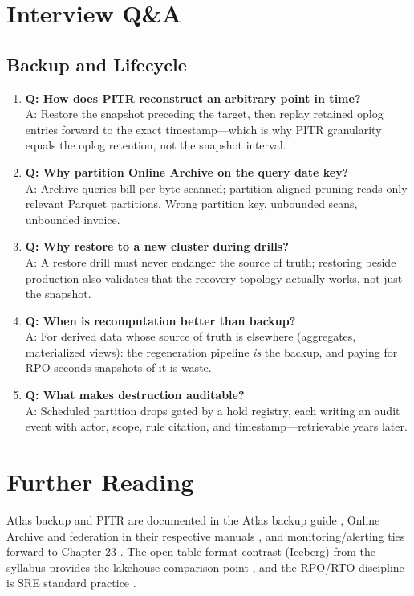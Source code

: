 \section{Interview Q\&A}
\subsection{Backup and Lifecycle}
\begin{enumerate}
    \item \textbf{Q: How does PITR reconstruct an arbitrary point in time?}\\
    A: Restore the snapshot preceding the target, then replay retained oplog entries forward to the exact timestamp---which is why PITR granularity equals the oplog retention, not the snapshot interval.

    \item \textbf{Q: Why partition Online Archive on the query date key?}\\
    A: Archive queries bill per byte scanned; partition-aligned pruning reads only relevant Parquet partitions. Wrong partition key, unbounded scans, unbounded invoice.

    \item \textbf{Q: Why restore to a new cluster during drills?}\\
    A: A restore drill must never endanger the source of truth; restoring beside production also validates that the recovery topology actually works, not just the snapshot.

    \item \textbf{Q: When is recomputation better than backup?}\\
    A: For derived data whose source of truth is elsewhere (aggregates, materialized views): the regeneration pipeline \emph{is} the backup, and paying for RPO-seconds snapshots of it is waste.

    \item \textbf{Q: What makes destruction auditable?}\\
    A: Scheduled partition drops gated by a hold registry, each writing an audit event with actor, scope, rule citation, and timestamp---retrievable years later.
\end{enumerate}

\section{Further Reading}
Atlas backup and PITR are documented in the Atlas backup guide \cite{mongodbAtlasBackupDocs}, Online Archive and federation in their respective manuals \cite{mongodbOnlineArchiveDocs,mongodbDataFederationDocs}, and monitoring/alerting ties forward to Chapter 23 \cite{mongodbAtlasMonitoringDocs}. The open-table-format contrast (Iceberg) from the syllabus provides the lakehouse comparison point \cite{apacheIcebergRepo}, and the RPO/RTO discipline is SRE standard practice \cite{sreBook}.


